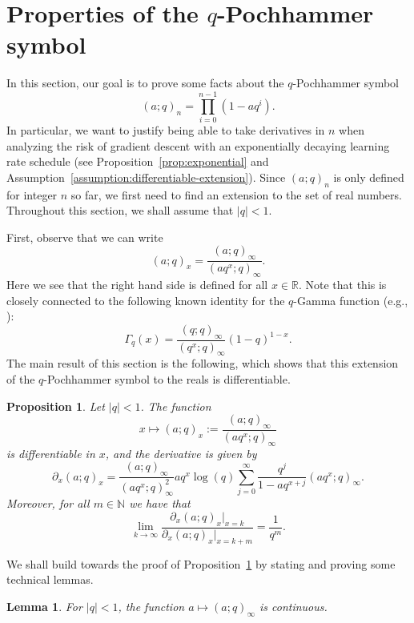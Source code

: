 \documentclass[11pt]{article}
\newtheorem{proposition}[theorem]{Proposition}
\newtheorem{lemma}{Lemma}
\begin{document}
\section{Properties of the \texorpdfstring{$q$}{q}-Pochhammer symbol}
\label{app:q-pochh}

In this section, our goal is to prove some facts about the $q$-Pochhammer symbol $$(a; q)_n = \prod_{i=0}^{n-1} (1 - aq^i).$$ In particular, we want to justify being able to take derivatives in $n$ when analyzing the risk of gradient descent with an exponentially decaying learning rate schedule (see Proposition~\ref{prop:exponential} and Assumption~\ref{assumption:differentiable-extension}).
Since $(a; q)_n$ is only defined for integer $n$ so far, we first need to find an extension to the set of real numbers. Throughout this section, we shall assume that $|q| < 1$.

First, observe that we can write
\begin{equation}
    (a;q)_x = \frac{(a;q)_{\infty}}{(aq^x;q)_\infty}.
\end{equation}
Here we see that the right hand side is defined for all $x \in \mathbb{R}$. Note that this is closely connected to the following known identity for the $q$-Gamma function (e.g., \cite{koekoek1996askey}):
\[
    \Gamma_q(x) = \frac{(q;q)_{\infty}}{(q^x;q)_\infty} (1-q)^{1-x}.
\]
The main result of this section is the following, which shows that this extension of the $q$-Pochhammer symbol to the reals is differentiable.

\begin{proposition} \label{prop:ratio-limit}
Let $|q| < 1$. The function
\[
    x \mapsto (a; q)_x := \frac{(a; q)_\infty}{(a q^x; q)_\infty}
\]
is differentiable in $x$, and the derivative is given by
\[
        \partial_x (a; q)_x = \frac{(a;q)_\infty}{(aq^x;q)_\infty^2} aq^{x}\log(q)\sum_{j=0}^\infty \frac{q^j}{1-aq^{x+j}} (aq^x;q)_\infty.
\]
Moreover, for all $m \in \mathbb{N}$ we have that 
\[
    \lim_{k \to \infty} \frac{\partial_x (a; q)_x |_{x = k}}{\partial_x (a; q)_x |_{x = k+m}} = \frac{1}{q^m}.
\]
\end{proposition}

We shall build towards the proof of Proposition~\ref{prop:ratio-limit} by stating and proving some technical lemmas.

\begin{lemma} \label{lemma:poch-cts}
For $|q| < 1$, the function $a \mapsto (a;q)_\infty$ is continuous.
\end{lemma}
\end{document}
